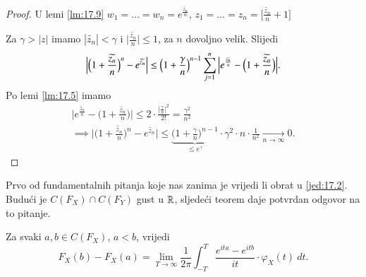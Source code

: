 \begin{proof}
    U lemi \ref{lm:17.9} $w_1 = \ldots = w_n = e^\frac{\widetilde{z_n}}{n}$, $z_1 = \ldots = z_n = \Big[ \frac{\widetilde{z_n}}{n} + 1 \Big]$

    Za $\gamma > |z|$ imamo $|\widetilde{z_n}| < \gamma$ i $\Big| \frac{\widetilde{z_n}}{n} \Big| \leq 1$, za $n$ dovoljno velik.
    Slijedi
    \begin{equation*}
        \Big| \Big( 1 + \frac{\widetilde{z_n}}{n} \Big)^n - e^{\widetilde{z_n}} \Big| \leq \Big(1 + \frac{\gamma}{n} \Big)^{n-1} \sum\limits_{j = 1}^{n} \Big| e^{\frac{\widetilde{z_n}}{n}} - \Big(1 + \frac{\widetilde{z_n}}{n}\Big) \Big|.
    \end{equation*}
    Po lemi \ref{lm:17.5} imamo
    \begin{equation*}
        \begin{gathered}
            \Big| e^{\frac{\widetilde{z_n}}{n}} - \Big( 1 + \frac{\widetilde{z_n}}{n} \Big) \Big| \leq 2 \cdot \frac{\Big| \frac{\gamma}{n}\Big|^2}{2!} = \frac{\gamma^2}{n^2}\\
            \implies \Big| \Big( 1 + \frac{\widetilde{z_n}}{n} \Big)^n - e^{\widetilde{z_n}} \Big| \leq \underbrace{\Big( 1 + \frac{\gamma}{n} \Big)^{n - 1}}_{\leq e^\gamma} \cdot \gamma^2 \cdot n \cdot \frac{1}{n^2} \xrightarrow[n \to \infty]{} 0.
        \end{gathered}
    \end{equation*}
\end{proof}

Prvo od fundamentalnih pitanja koje nas zanima je vrijedi li obrat u \eqref{jed:17.2}.
Budu\' ci je $C(F_X) \cap C(F_Y)$ gust u $\mathbb{R}$, sljede\' ci teorem daje potvrdan odgovor na to pitanje.

\begin{tm}  \label{tm:17.11}
    Za svaki $a, b \in C(F_X)$, $a < b$, vrijedi
    \begin{equation*}
        F_X (b) - F_X (a) = \lim\limits_{T \to \infty} \frac{1}{2 \pi} \int_{-T}^T \frac{e^{ita} - e^{itb}}{it} \cdot \varphi_X (t) \: d t.
    \end{equation*}
\end{tm}